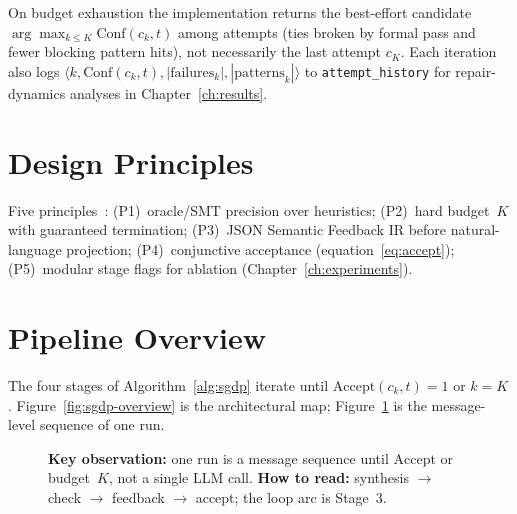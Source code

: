 On budget exhaustion the implementation returns the best-effort candidate
$\arg\max_{k\le K}\mathrm{Conf}(c_k,t)$ among attempts (ties broken by formal
pass and fewer blocking pattern hits), not necessarily the last attempt $c_K$.
Each iteration also logs
$\langle k, \mathrm{Conf}(c_k,t), |\text{failures}_k|, |\text{patterns}_k|\rangle$
to \texttt{attempt\_history} for repair-dynamics analyses in
Chapter~\ref{ch:results}.




\section{Design Principles}
\label{sec:method:principles}

Five principles~\citep{woodcock2009formalsurvey, chen2021codex}:
(P1)~oracle/SMT precision over heuristics;
(P2)~hard budget~$K$ with guaranteed termination;
(P3)~JSON Semantic Feedback IR before natural-language projection;
(P4)~conjunctive acceptance (equation~\eqref{eq:accept});
(P5)~modular stage flags for ablation (Chapter~\ref{ch:experiments}).

\section{Pipeline Overview}
\label{sec:method:overview}

The four stages of Algorithm~\ref{alg:sgdp} iterate until
$\mathrm{Accept}(c_k,t)=1$ or $k=K$.
Figure~\ref{fig:sgdp-overview} is the architectural map;
Figure~\ref{fig:pipeline-seq} is the message-level sequence of one run.

\begin{figure}[t]
  \centering
  \caption{\textbf{Key observation:} one run is a message sequence until
    $\mathrm{Accept}$ or budget~$K$, not a single LLM call.
    \textbf{How to read:} synthesis $\to$ check $\to$ feedback $\to$ accept;
    the loop arc is Stage~3.}
  \label{fig:pipeline-seq}
\end{figure}

